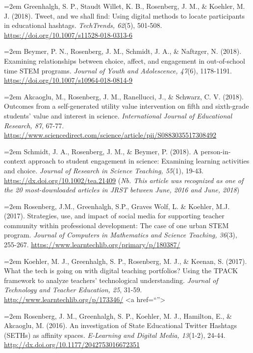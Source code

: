 \documentclass[
  11pt,
]{article}
\begin{document}
\hangindent=2em Greenhalgh, S. P., Staudt Willet, K. B., Rosenberg, J.
M., \& Koehler, M. J. (2018). Tweet, and we shall find: Using digital
methods to locate participants in educational hashtags.
\emph{TechTrends, 62}(5), 501-508.
\url{https://doi.org/10.1007/s11528-018-0313-6}

\hangindent=2em Beymer, P. N., Rosenberg, J. M., Schmidt, J. A., \&
Naftzger, N. (2018). Examining relationships between choice, affect, and
engagement in out-of-school time STEM programs. \emph{Journal of Youth
and Adolescence, 47}(6), 1178-1191.
\url{https://doi.org/10.1007/s10964-018-0814-9}

\hangindent=2em Akcaoglu, M., Rosenberg, J. M., Ranellucci, J., \&
Schwarz, C. V. (2018). Outcomes from a self-generated utility value
intervention on fifth and sixth-grade students' value and interest in
science. \emph{International Journal of Educational Research, 87},
67-77.
\url{https://www.sciencedirect.com/science/article/pii/S0883035517308492}

\hangindent=2em Schmidt, J. A., Rosenberg, J. M., \& Beymer, P. (2018).
A person-in-context approach to student engagement in science: Examining
learning activities and choice. \emph{Journal of Research in Science
Teaching, 55}(1), 19-43. \url{https://dx.doi.org/10.1002/tea.21409}
(\emph{Nb. This article was recognized as one of the 20 most-downloaded
articles in JRST between June, 2016 and June, 2018})

\hangindent=2em Rosenberg, J.M., Greenhalgh, S.P., Graves Wolf, L. \&
Koehler, M.J. (2017). Strategies, use, and impact of social media for
supporting teacher community within professional development: The case
of one urban STEM program. \emph{Journal of Computers in Mathematics and
Science Teaching, 36}(3), 255-267.
\url{https://www.learntechlib.org/primary/p/180387/}

\hangindent=2em Koehler, M. J., Greenhalgh, S. P., Rosenberg, M. J., \&
Keenan, S. (2017). What the tech is going on with digital teaching
portfolios? Using the TPACK framework to analyze teachers' technological
understanding. \emph{Journal of Technology and Teacher Education, 25},
31-59. \url{http://www.learntechlib.org/p/173346/} \textless a
href=``''\textgreater{}

\hangindent=2em Rosenberg, J. M., Greenhalgh, S. P., Koehler, M. J.,
Hamilton, E., \& Akcaoglu, M. (2016). An investigation of State
Educational Twitter Hashtags (SETHs) as affinity spaces.
\emph{E-Learning and Digital Media, 13}(1-2), 24-44.
\url{http://dx.doi.org/10.1177/2042753016672351}
\end{document}
